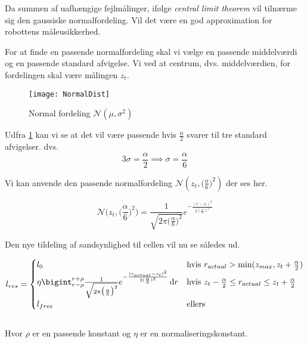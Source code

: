 Da summen af uafhængige fejlmålinger, ifølge \emph{central limit theorem} vil tilnærme sig
den gaussiske normalfordeling. \cite[p. 223]{ArtificialIntelligence}
Vil det være en god approximation for robottens måleusikkerhed.

For at finde en passende normalfordeling skal vi vælge en passende middelværdi og en passende standard afvigelse. 
Vi ved at centrum, dvs. middelværdien, for fordelingen skal være målingen $z_t$.

\begin{figure}
\centering \texttt{[image: NormalDist]}
\label{normaldistimg}
\caption{Normal fordeling $\mathcal{N}(\mu,\sigma^2)$}
\end{figure}

Udfra \cref{normaldistimg} kan vi se at det vil være passende hvis $\frac{\alpha}{2}$ svarer til tre standard afvigelser. dvs.
\begin{equation}
	3\sigma = \frac{\alpha}{2} \implies \sigma = \frac{\alpha}{6}
\end{equation}

Vi kan anvende den passende normalfordeling $\mathcal{N}(z_t,\big(\frac{\alpha}{6}\big)^2)$ der ses her. 

\begin{equation}
\mathcal{N}\bigg(z_t,\bigg(\frac{\alpha}{6}\bigg)^2\bigg) = 
\frac{1}{\sqrt{2 \pi \big(\frac{\alpha}{6}\big)^2}}e^{- \frac{(x - z_t)^2}{2 (\frac{\alpha}{6})^2}}
\end{equation}

Den nye tildeling af sandsynlighed til cellen vil nu se således ud.

\begin{equation}
l_{res} = \begin{cases} 
	l_0 &\text{hvis }r_{actual} > \text{min}(z_{max},z_t+\frac{\alpha}{2}) \\ 
	
	
	\eta \bigint_{r-\rho}^{r+\rho} \frac{1}{\sqrt{2 \pi \big(\frac{\alpha}{6}\big)^2}}e^{- \frac{(r_{actual} - z_t)^2}{2 (\frac{\alpha}{6})^2}}\, \mathrm{d}r
		&\text{hvis } z_t-\frac{\alpha}{2} \leq r_{actual} \leq z_t+\frac{\alpha}{2}\\ 

	l_{free} &\text{ellers}	
\end{cases}
\end{equation}
\\
Hvor $\rho$ er en passende konstant og $\eta$ er en normaliseringskonstant.



